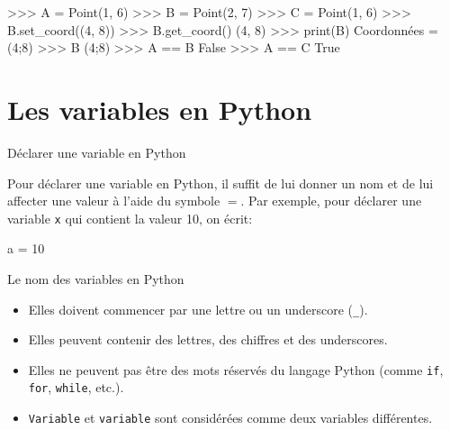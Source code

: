 \begin{propriete}{}

    \begin{CodePythontexAlt}[Largeur=1\linewidth,Centre,Lignes=true,PremLigne=1]{}
        >>> A = Point(1, 6)
        >>> B = Point(2, 7)
        >>> C = Point(1, 6)
        >>> B.set_coord((4, 8))
        >>> B.get_coord()
        (4, 8)
        >>> print(B)
        Coordonnées = (4;8)
        >>> B
        (4;8)
        >>> A == B
        False
        >>> A == C
        True
    \end{CodePythontexAlt}
    
\end{propriete}

\section{Les variables en Python}

\begin{easybox}{Déclarer une variable en Python}

	Pour déclarer une variable en Python, il suffit de lui donner un nom et de lui affecter une valeur à l'aide du symbole $=$. Par exemple, pour déclarer une variable \texttt{x} qui contient la valeur 10, on écrit:

\begin{minipage}{0.48\linewidth}
	\begin{CodePythontexAlt}[Largeur=1\linewidth,Centre,Lignes=true,PremLigne=1, Lignes=false,]{}
    a = 10
    \end{CodePythontexAlt}
\end{minipage}\hfill{}
\begin{minipage}{0.48\linewidth}
\begin{scratch}
\end{scratch}
\end{minipage}
\end{easybox}


\begin{easybox}{Le nom des variables en Python}
	\begin{itemize}
		\item Elles doivent commencer par une lettre ou un underscore (\texttt{\_}).
		\item Elles peuvent contenir des lettres, des chiffres et des underscores.
		\item Elles ne peuvent pas être des mots réservés du langage Python (comme \texttt{if}, \texttt{for}, \texttt{while}, etc.).
		\item \texttt{Variable} et \texttt{variable} sont considérées comme deux variables différentes.
	\end{itemize}
\end{easybox}

